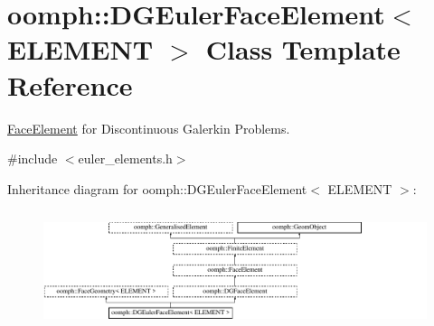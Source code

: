 \hypertarget{classoomph_1_1DGEulerFaceElement}{}\section{oomph\+:\+:D\+G\+Euler\+Face\+Element$<$ E\+L\+E\+M\+E\+NT $>$ Class Template Reference}
\label{classoomph_1_1DGEulerFaceElement}


\hyperlink{classoomph_1_1FaceElement}{Face\+Element} for Discontinuous Galerkin Problems.  




{\ttfamily \#include $<$euler\+\_\+elements.\+h$>$}

Inheritance diagram for oomph\+:\+:D\+G\+Euler\+Face\+Element$<$ E\+L\+E\+M\+E\+NT $>$\+:\begin{figure}[H]
\begin{center}
\leavevmode
\includegraphics[height=3.508772cm]{classoomph_1_1DGEulerFaceElement}
\end{center}
\end{figure}
